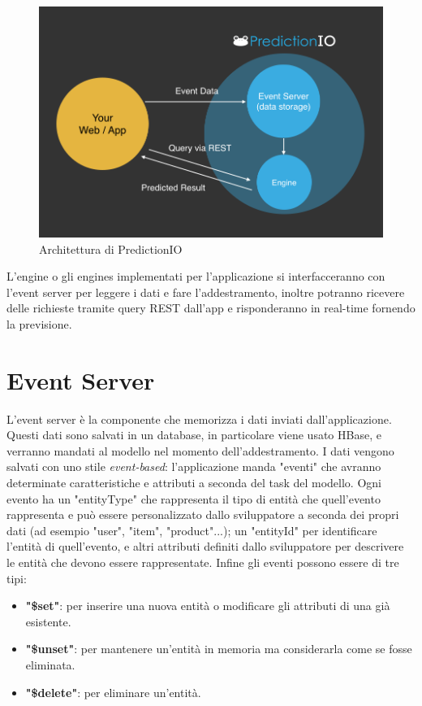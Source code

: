 \begin{figure}[!h]
\includegraphics[width=1.0\textwidth]{immagini/app_integration.png}
\caption{Architettura di PredictionIO \cite{sitopredictionio}}
\label{fig:app_integration}
\end{figure}

L'engine o gli engines implementati per l'applicazione si interfacceranno con l'event server per leggere i dati e fare l'addestramento, inoltre potranno ricevere delle richieste tramite query REST dall'app e risponderanno in real-time fornendo la previsione.

\section{Event Server}
L'event server è la componente che memorizza i dati inviati dall'applicazione. Questi dati sono salvati in un database, in particolare viene usato HBase, e verranno mandati al modello nel momento dell'addestramento. I dati vengono salvati con uno stile \textit{event-based}: l'applicazione manda "eventi" che avranno determinate caratteristiche e attributi a seconda del task del modello. Ogni evento ha un "entityType" che rappresenta il tipo di entità che quell'evento rappresenta e può essere personalizzato dallo sviluppatore a seconda dei propri dati (ad esempio "user", "item", "product"...); un "entityId" per identificare l'entità di quell'evento, e altri attributi definiti dallo sviluppatore per descrivere le entità che devono essere rappresentate. Infine gli eventi possono essere di tre tipi:

\begin{itemize}
\item \textbf{"\$set"}: per inserire una nuova entità o modificare gli attributi di una già esistente.
\item \textbf{"\$unset"}: per mantenere un'entità in memoria ma considerarla come se fosse eliminata.
\item \textbf{"\$delete"}: per eliminare un'entità.
\end{itemize}

